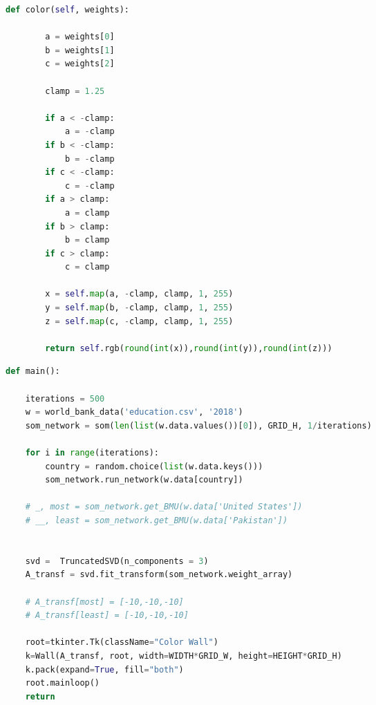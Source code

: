 \documentclass[12pt]{report} %
\begin{document}
\begin{changemargin}{-1cm}{-1cm}
\begin{lstlisting}[language=python, caption= {Code to create a visualization of the SOM using Tkinter}, captionpos=b]
    def color(self, weights):

        a = weights[0]
        b = weights[1]
        c = weights[2]

        clamp = 1.25

        if a < -clamp:
            a = -clamp
        if b < -clamp:
            b = -clamp
        if c < -clamp:
            c = -clamp
        if a > clamp:
            a = clamp
        if b > clamp:
            b = clamp
        if c > clamp:
            c = clamp

        x = self.map(a, -clamp, clamp, 1, 255)
        y = self.map(b, -clamp, clamp, 1, 255)
        z = self.map(c, -clamp, clamp, 1, 255) 

        return self.rgb(round(int(x)),round(int(y)),round(int(z)))
\end{lstlisting}

\newpage

\begin{lstlisting}[language=python, caption= {Main code that uses world bank data to train an SOM, decomposes weights to 3-dimensional RGB vectors using Singular Value Decomposition, and creates a visualization on Tkinter}, captionpos=b]
def main():

    iterations = 500
    w = world_bank_data('education.csv', '2018')
    som_network = som(len(list(w.data.values())[0]), GRID_H, 1/iterations)

    for i in range(iterations):
        country = random.choice(list(w.data.keys()))
        som_network.run_network(w.data[country])

    # _, most = som_network.get_BMU(w.data['United States'])
    # __, least = som_network.get_BMU(w.data['Pakistan'])

    
    svd =  TruncatedSVD(n_components = 3)
    A_transf = svd.fit_transform(som_network.weight_array)

    # A_transf[most] = [-10,-10,-10]
    # A_transf[least] = [-10,-10,-10]

    root=tkinter.Tk(className="Color Wall")
    k=Wall(A_transf, root, width=WIDTH*GRID_W, height=HEIGHT*GRID_H)
    k.pack(expand=True, fill="both")
    root.mainloop()
    return
\end{lstlisting}
\end{changemargin}
\end{document}
